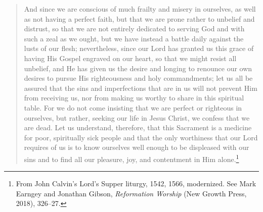 \documentclass[
]{book}
\begin{document}
\begin{enumerate}
\begin{quote}
  And since we are conscious of much frailty and misery in ourselves, as well as not having a perfect faith, but that we are prone rather to unbelief and distrust, so that we are not entirely dedicated to serving God and with such a zeal as we ought, but we have instead a battle daily against the lusts of our flesh; nevertheless, since our Lord has granted us this grace of having His Gospel engraved on our heart, so that we might resist all unbelief, and He has given us the desire and longing to renounce our own desires to pursue His righteousness and holy commandments; let us all be assured that the sins and imperfections that are in us will not prevent Him from receiving us, nor from making us worthy to share in this spiritual table. For we do not come insisting that we are perfect or righteous in ourselves, but rather, seeking our life in Jesus Christ, we confess that we are dead. Let us understand, therefore, that this Sacrament is a medicine for poor, spiritually sick people and that the only worthiness that our Lord requires of us is to know ourselves well enough to be displeased with our sins and to find all our pleasure, joy, and contentment in Him alone.\footnote{From John Calvin's Lord's Supper liturgy, 1542, 1566, modernized. See Mark Earngey and Jonathan Gibson, \emph{Reformation Worship} (New Growth Press, 2018), 326--27.}
  \end{quote}
\end{enumerate}
\end{document}
